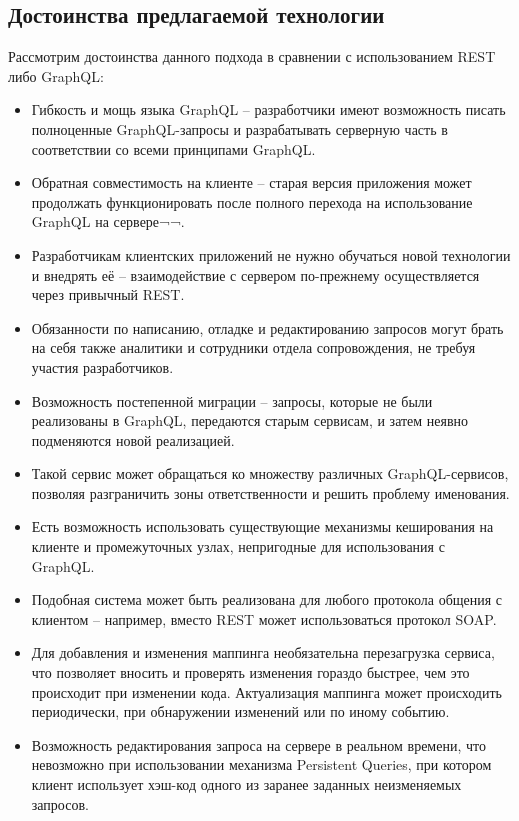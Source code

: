 \subsection{Достоинства предлагаемой технологии}\label{subsec:proposed-technology-advantages}

Рассмотрим достоинства данного подхода в сравнении с использованием REST либо GraphQL:

\begin{itemize}
	\item Гибкость и мощь языка GraphQL – разработчики имеют возможность писать полноценные GraphQL-запросы и разрабатывать серверную часть в соответствии со всеми принципами GraphQL.
	\item Обратная совместимость на клиенте – старая версия приложения может продолжать функционировать после полного перехода на использование GraphQL на сервере¬¬.
	\item Разработчикам клиентских приложений не нужно обучаться новой технологии и внедрять её – взаимодействие с сервером по-прежнему осуществляется через привычный REST.
	\item Обязанности по написанию, отладке и редактированию запросов могут брать на себя также аналитики и сотрудники отдела сопровождения, не требуя участия разработчиков.
	\item Возможность постепенной миграции – запросы, которые не были реализованы в GraphQL, передаются старым сервисам, и затем неявно подменяются новой реализацией.
	\item Такой сервис может обращаться ко множеству различных GraphQL-сервисов, позволяя разграничить зоны ответственности и решить проблему именования.
	\item Есть возможность использовать существующие механизмы кеширования на клиенте и промежуточных узлах, непригодные для использования с GraphQL.
	\item Подобная система может быть реализована для любого протокола общения с клиентом – например, вместо REST может использоваться протокол SOAP.
	\item Для добавления и изменения маппинга необязательна перезагрузка сервиса, что позволяет вносить и проверять изменения гораздо быстрее, чем это происходит при изменении кода.
	Актуализация маппинга может происходить периодически, при обнаружении изменений или по иному событию.
	\item Возможность редактирования запроса на сервере в реальном времени, что невозможно при использовании механизма Persistent Queries, при котором клиент использует хэш-код одного из заранее заданных неизменяемых запросов.

\end{itemize}

